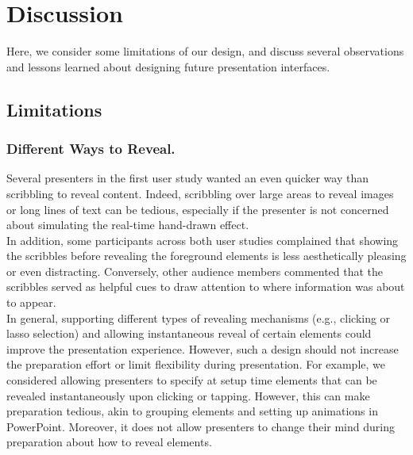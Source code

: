 
\section{Discussion}
Here, we consider some limitations of our design, and discuss several observations and lessons learned about designing future presentation interfaces.

\subsection{Limitations}
\subsubsection{Different Ways to Reveal.}  
Several presenters in the first user study wanted an even quicker way than scribbling to reveal content. Indeed, scribbling over large areas to reveal images or long lines of text can be tedious, especially if the presenter is not concerned about simulating the real-time hand-drawn effect. \\

In addition, some participants across both user studies complained that showing the scribbles before revealing the foreground elements is less aesthetically pleasing or even distracting. Conversely, other audience members commented that the scribbles served as helpful cues to draw attention to where information was about to appear.\\

In general, supporting different types of revealing mechanisms (e.g., clicking or lasso selection) and allowing instantaneous reveal of certain elements could improve the presentation experience. However, such a design should not increase the preparation effort or limit flexibility during presentation. For example, we considered allowing presenters to specify at setup time elements that can be revealed instantaneously upon clicking or tapping. However, this can make preparation tedious, akin to grouping elements and setting up animations in PowerPoint. Moreover, it does not allow presenters to change their mind during preparation about how to reveal elements. 

